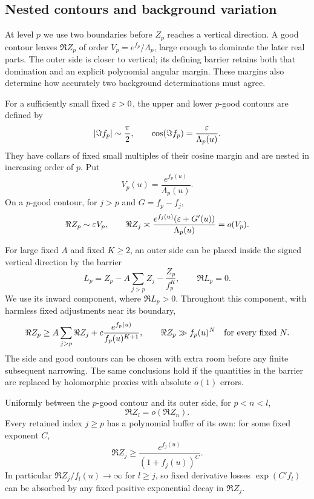 \subsection{Nested contours and background variation}

At level $p$ we use two boundaries before $Z_p$ reaches a vertical
direction. A good contour leaves $\Re Z_p$ of order
$V_p=e^{f_p}/\Lambda_p$, large enough to dominate the later real
parts. The outer side is closer to vertical; its defining barrier
retains both that domination and an explicit polynomial angular margin.
These margins also determine how accurately two background determinations
must agree.

\begin{lemma}\label{lem:flags-contours}
For a sufficiently small fixed $\varepsilon>0$, the upper and lower
$p$-good contours are defined by
\begin{equation}\label{eq:flags-good}
 |\Im f_p|\sim\frac\pi2,\qquad
 \cos(\Im f_p)=\frac{\varepsilon}{\Lambda_p(u)}.
\end{equation}
They have collars of fixed small multiples of their cosine margin
and are nested in increasing order of $p$. Put
\[
 V_p(u)=\frac{e^{f_p(u)}}{\Lambda_p(u)}.
\]
On a $p$-good contour, for $j>p$ and $G=f_p-f_j$,
\begin{equation}\label{eq:flags-good-real}
 \Re Z_p\sim\varepsilon V_p,
 \qquad
 \Re Z_j\asymp
 \frac{e^{f_j(u)}(\varepsilon+G'(u))}{\Lambda_p(u)}
       =o(V_p).
\end{equation}

For large fixed $A$ and fixed $K\ge2$, an outer side can be placed
inside the signed vertical direction by the barrier
\begin{equation}\label{eq:flags-side}
 L_p=Z_p-A\sum_{j>p}Z_j-\frac{Z_p}{f_p^K},
 \qquad \Re L_p=0.
\end{equation}
We use its inward component, where $\Re L_p>0$. Throughout this
component, with harmless fixed adjustments near its boundary,
\begin{equation}\label{eq:flags-buffer}
 \Re Z_p\ge A\sum_{j>p}\Re Z_j
               +c\frac{e^{f_p(u)}}{f_p(u)^{K+1}},
 \qquad \Re Z_p\gg f_p(u)^N
 \quad\hbox{for every fixed }N.
\end{equation}
The side and good contours can be chosen with extra room before any
finite subsequent narrowing. The same conclusions hold if the
quantities in the barrier are replaced by holomorphic proxies with
absolute $o(1)$ errors.

Uniformly between the $p$-good contour and its outer side, for
$p<n<l$,
\begin{equation}\label{eq:flags-later-real}
 \Re Z_l=o(\Re Z_n).
\end{equation}
Every retained index $j\ge p$ has a polynomial buffer of its own:
for some fixed exponent $C$,
\begin{equation}\label{eq:flags-retained-buffer}
 \Re Z_j\ge\frac{e^{f_j(u)}}{(1+f_j(u))^C}.
\end{equation}
In particular $\Re Z_j/f_l(u)\to\infty$ for $l\ge j$, so
fixed derivative losses $\exp(C'f_l)$ can be absorbed by any fixed
positive exponential decay in $\Re Z_j$.
\end{lemma}

